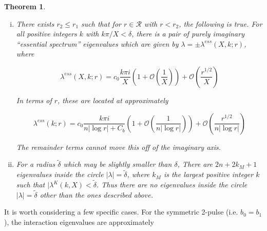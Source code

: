 \documentclass[12pt]{article}
\newtheorem{theorem}{Theorem}
\begin{document}
\begin{theorem}
\begin{enumerate}[(i)]
\begin{itemize}
\item For $M > 0$ ($M < 0$), there are $n_{\text{even}}$ purely imaginary (real) pairs of interaction eigenvalues.
\item For $M > 0$ ($M < 0$), there are $n_{\text{odd}}$ real (purely imaginary) pairs of interaction eigenvalues.
\end{itemize}

where $n_{\text{even}}$ is the number of even $m_k$ (excluding $m_j$) and $n_{\text{odd}}$ is the number of odd $m_k$ (excluding $m_j$).

\item There exists $r_2 \leq r_1$ such that for $r \in \mathcal{R}$ with $r < r_2$, the following is true. For all positive integers $k$ with $k \pi / X < \delta$, there is a pair of purely imaginary ``essential spectrum'' eigenvalues which are given by $\lambda = \pm \lambda^{ess}(X,k; r)$, where

\begin{equation}\label{lambdaess}
\lambda^{ess}(X, k; r) = c_0 \frac{k \pi i }{X} \left( 1 + \mathcal{O}\left( \frac{1}{X} \right)\right) + \mathcal{O}\left( \frac{r^{1/2}}{X} \right)
\end{equation}

In terms of $r$, these are located at approximately

\begin{equation}\label{lambdaessr}
\lambda^{ess}(k; r) = c_0 \frac{k \pi i }{n |\log r| + C_b}  \left( 1 + \mathcal{O}\left( \frac{1}{n |\log r|} \right)\right) + \mathcal{O}\left( \frac{r^{1/2}}{n |\log r|} \right)
\end{equation}

The remainder terms cannot move this off of the imaginary axis.

\item For a radius $\tilde{\delta}$ which may be slightly smaller than $\delta$, There are $2n + 2 k_M + 1$ eigenvalues inside the circle $|\lambda| = \tilde{\delta}$, where $k_M$ is the largest positive integer $k$ such that $|\lambda^K(k,X) < \tilde{\delta}$. Thus there are no eigenvalues inside the circle $|\lambda| = \tilde{\delta}$ other than the ones described above.
\end{enumerate}

\end{theorem}

It is worth considering a few specific cases. For the symmetric 2-pulse (i.e. $b_0 = b_1$), the interaction eigenvalues are approximately
\end{document}
